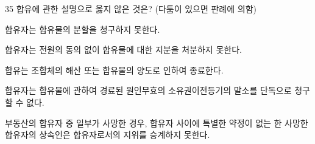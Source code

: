 \begin{question}{35}
합유에 관한 설명으로 옳지 않은 것은? (다툼이 있으면 판례에 의함)
\begin{choices}
  \item 합유자는 합유물의 분할을 청구하지 못한다.
  \item 합유자는 전원의 동의 없이 합유물에 대한 지분을 처분하지 못한다.
  \item 합유는 조합체의 해산 또는 합유물의 양도로 인하여 종료한다.
  \item 합유자는 합유물에 관하여 경료된 원인무효의 소유권이전등기의 말소를 단독으로 청구할 수 없다.
  \item 부동산의 합유자 중 일부가 사망한 경우, 합유자 사이에 특별한 약정이 없는 한 사망한 합유자의 상속인은 합유자로서의 지위를 승계하지 못한다.
\end{choices}
\end{question}
